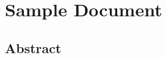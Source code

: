 \documentclass{article}
\begin{document}

\section{Sample Document}

\subsection{Abstract}

\lipsum[5]
\end{document}
